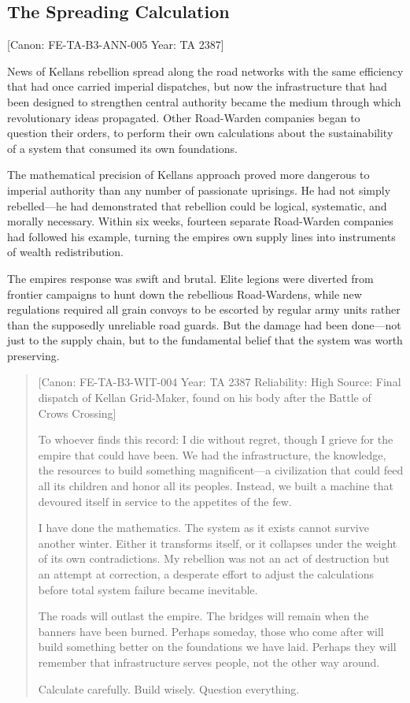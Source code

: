 \subsection{The Spreading Calculation}\label{the-spreading-calculation}

{[}Canon: FE-TA-B3-ANN-005 \textbar{} Year: TA 2387{]}

News of Kellan\textquotesingle s rebellion spread along the road
networks with the same efficiency that had once carried imperial
dispatches, but now the infrastructure that had been designed to
strengthen central authority became the medium through which
revolutionary ideas propagated. Other Road-Warden companies began to
question their orders, to perform their own calculations about the
sustainability of a system that consumed its own foundations.

The mathematical precision of Kellan\textquotesingle s approach proved
more dangerous to imperial authority than any number of passionate
uprisings. He had not simply rebelled---he had demonstrated that
rebellion could be logical, systematic, and morally necessary. Within
six weeks, fourteen separate Road-Warden companies had followed his
example, turning the empire\textquotesingle s own supply lines into
instruments of wealth redistribution.

The empire\textquotesingle s response was swift and brutal. Elite
legions were diverted from frontier campaigns to hunt down the
rebellious Road-Wardens, while new regulations required all grain
convoys to be escorted by regular army units rather than the supposedly
unreliable road guards. But the damage had been done---not just to the
supply chain, but to the fundamental belief that the system was worth
preserving.

\begin{quote}
{[}Canon: FE-TA-B3-WIT-004 \textbar{} Year: TA 2387 \textbar{}
Reliability: High \textbar{} Source: Final dispatch of Kellan
Grid-Maker, found on his body after the Battle of Crow\textquotesingle s
Crossing{]}

To whoever finds this record: I die without regret, though I grieve for
the empire that could have been. We had the infrastructure, the
knowledge, the resources to build something magnificent---a civilization
that could feed all its children and honor all its peoples. Instead, we
built a machine that devoured itself in service to the appetites of the
few.

I have done the mathematics. The system as it exists cannot survive
another winter. Either it transforms itself, or it collapses under the
weight of its own contradictions. My rebellion was not an act of
destruction but an attempt at correction, a desperate effort to adjust
the calculations before total system failure became inevitable.

The roads will outlast the empire. The bridges will remain when the
banners have been burned. Perhaps someday, those who come after will
build something better on the foundations we have laid. Perhaps they
will remember that infrastructure serves people, not the other way
around.

Calculate carefully. Build wisely. Question everything.
\end{quote}

